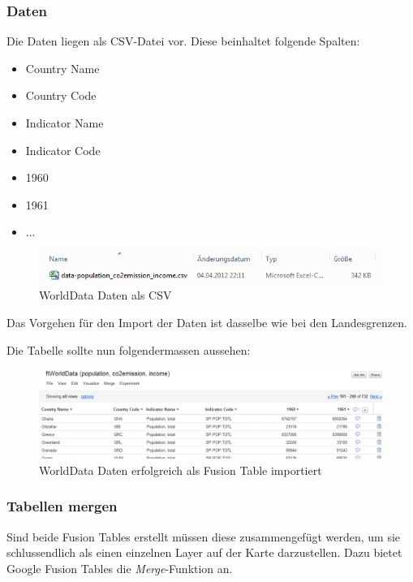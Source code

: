 \subsubsection{Daten}
Die Daten liegen als CSV-Datei vor. Diese beinhaltet folgende Spalten:
\begin{itemize}
\item Country Name
\item Country Code
\item Indicator Name
\item Indicator Code
\item 1960
\item 1961
\item ...
\end{itemize}

\begin{figure}[htbp]
	\centering
	\includegraphics{images/usecase1-worlddata/worlddata-data_csv.png}
	\caption{WorldData Daten als CSV}
	\label{worlddata-data_csv}
\end{figure}

Das Vorgehen für den Import der Daten ist dasselbe wie bei den Landesgrenzen.

Die Tabelle sollte nun folgendermassen aussehen:

\begin{figure}[htbp]
	\centering
	\includegraphics[scale=0.5]{images/usecase1-worlddata/worlddata-data_import_done.png}
	\caption{WorldData Daten erfolgreich als Fusion Table importiert}
	\label{worlddata-data_import_done}
\end{figure}

\subsubsection{Tabellen mergen}
Sind beide Fusion Tables erstellt müssen diese zusammengefügt werden, um sie schlussendlich als einen einzelnen Layer auf der Karte darzustellen. Dazu bietet Google Fusion Tables die \emph{Merge}-Funktion an. 

